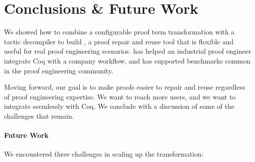 \section{Conclusions \& Future Work}
\label{sec:discussion}

We showed how to combine a configurable proof term transformation with a tactic decompiler to build \toolname,
a proof repair and reuse tool that is flexible and useful for real proof engineering scenarios.
\toolname has helped an industrial proof engineer integrate Coq with a company workflow,
and has supported benchmarks common in the proof engineering community.

Moving forward, our goal is to make proofs easier to repair and reuse regardless of proof engineering expertise.
We want to reach more users, and we want \toolname to integrate seemlessly with Coq.
We conclude with a discussion of some of the challenges that remain.


\paragraph{Future Work}

We encountered three challenges in scaling up the \toolname transformation:

